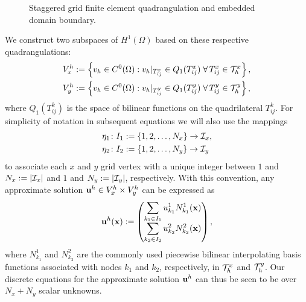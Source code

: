\setlength{\figurewidth}{0.32\columnwidth}
\begin{figure}[htbp]
\begin{center}
\caption{Staggered grid finite element quadrangulation and embedded domain boundary.}
\label{fig:ch5.embedding}
\end{center}
\end{figure}

We construct two subspaces of $H^1(\Omega)$ based on these respective quadrangulations:
\begin{align*}
V_x^h & := \left\lbrace  v_h \in C^0(\Omega) : v_h \rvert_{T^x_{ij}} \in Q_1(T^x_{ij}) \; \forall \, T^x_{ij} \in \mathcal{T}^x_h  \right\rbrace, \\
V_y^h & := \left\lbrace  v_h \in C^0(\Omega) : v_h \rvert_{T^y_{ij}} \in Q_1(T^y_{ij}) \; \forall \, T^y_{ij} \in \mathcal{T}^y_h  \right\rbrace,
\end{align*}
where $Q_1(T^k_{ij})$ is the space of bilinear functions on the quadrilateral $T^k_{ij}$. For simplicity of notation in subsequent equations we will also use the mappings
\begin{align*}
& \eta_1 \colon I_1 := \{ 1, 2, \dotsc, N_x \} \to \mathcal{I}_x, \\
& \eta_2 \colon I_2 := \{1, 2, \dotsc, N_y \} \to \mathcal{I}_y
\end{align*}
to associate each $x$ and $y$ grid vertex with a unique integer between $1$ and
$N_x := \left\lvert \mathcal{I}_x \right\rvert$ and $1$ and $N_y := \left\lvert \mathcal{I}_y \right\rvert$, respectively. With this convention, any approximate solution $\mathbf{u}^h \in V_x^h \times V_y^h$ can be expressed as
\begin{equation} \label{eq:ch5.staggeredapproximation.u}
\mathbf{u}^h(\mathbf{x}) :=
\begin{pmatrix}
\displaystyle \sum_{k_1 \in I_1} u^1_{k_1} N^1_{k_1}(\mathbf{x}) \\
\displaystyle \sum_{k_2 \in I_2} u^2_{k_2} N^2_{k_2}(\mathbf{x})
\end{pmatrix},
\end{equation}
where $N^1_{k_1}$ and $N^2_{k_2}$ are the commonly used piecewise bilinear interpolating basis functions associated with nodes $k_1$ and $k_2$, respectively, in $\mathcal{T}^x_h$ and $\mathcal{T}^y_h$. Our discrete equations for the approximate solution $\mathbf{u}^h$ can thus be seen to be over $N_x + N_y$ scalar unknowns.


